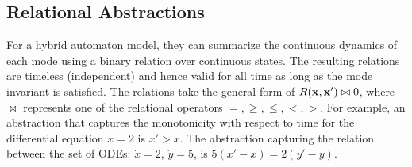 %



\subsection{Relational Abstractions}
For a hybrid automaton model, they can summarize the continuous
dynamics of each mode using a binary relation over continuous states.
The resulting relations are timeless (independent) and hence valid for
all time as long as the mode invariant is satisfied. The relations
take the general form of $R(\mathbf{x},\mathbf{x}') \bowtie 0$, where $\bowtie$
represents one of the relational operators $=, \ge, \le, <, >$. For
example, an abstraction that captures the monotonicity with respect to
time for the differential equation $\dot{x} = 2$ is $x' > x$. The
abstraction capturing the relation between the set of ODEs: $\dot{x} =
2$, $\dot{y} = 5$, is $5(x' - x) = 2(y' - y)$.



